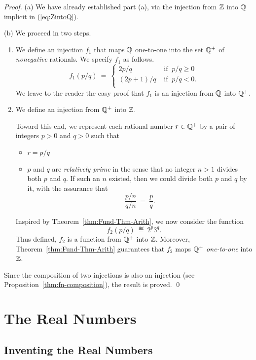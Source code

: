 \begin{proof}
(a) We have already established part (a), via the injection from $\mathbb{Z}$
into $\mathbb{Q}$ implicit in (\ref{eq:ZintoQ}).

\medskip

\noindent (b)
We proceed in two steps.
\begin{enumerate}
\item
We define an injection $f_1$ that maps $\mathbb{Q}$ one-to-one into the set
$\mathbb{Q}^+$ of {\em nonegative} rationals.  We specify $f_1$ as follows.
\[ f_1(p/q) \ = \ \left\{
\begin{array}{cl}
2p/q & \mbox{ if } \ p/q \geq 0 \\
(2p+1)/q & \mbox{ if } \ p/q < 0. \\
\end{array}
\right.
\]
We leave to the reader the easy proof that $f_1$ is an injection from
$\mathbb{Q}$ into $\mathbb{Q}^+$.

\item
We define an injection from $\mathbb{Q}^+$ into $\mathbb{Z}$.

Toward this end, we represent each rational number $r \in \mathbb{Q}^+$ by a
pair of integers $p > 0$ and $q >0$ such that
\begin{itemize}
\item
$r = p/q$

\item
$p$ and $q$ are {\em relatively prime}  in the sense that no integer $n > 1$ divides both $p$ and
  $q$.  If such an $n$ existed, then we could divide both $p$ and $q$
  by it, with the assurance that
\[ \frac{p/n}{q/n} \ = \ \frac{p}{q}. \]
\end{itemize}
Inspired by Theorem~\ref{thm:Fund-Thm-Arith}, we now consider the
function
\[ f_2(p/q) \ \eqdef \ 2^p 3^q. \]
Thus defined, $f_2$ is a function from $\mathbb{Q}^+$ into $\mathbb{Z}$.  Moreover,
Theorem~\ref{thm:Fund-Thm-Arith} guarantees that $f_2$ maps $\mathbb{Q}^+$
{\em one-to-one} into $\mathbb{Z}$.
\end{enumerate}
Since the composition of two injections is also an injection (see
Proposition~\ref{thm:fn-composition}), the result is proved.  \qed
\end{proof}

\section{The Real Numbers}
\label{sec:reals}

\subsection{Inventing the Real Numbers}

